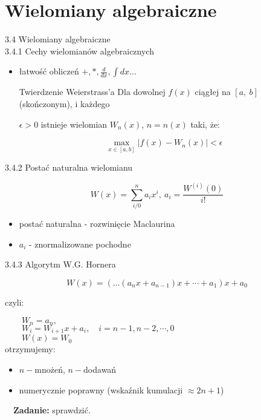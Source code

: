 \section{Wielomiany algebraiczne}
	\begin{frame}{3.4 Wielomiany algebraiczne \\ 3.4.1 Cechy wielomianów algebraicznych}
	

	\begin{itemize}
	\item łatwość obliczeń $+, *, \displaystyle \frac{d}{dx}, \displaystyle \int dx\ldots $ \newline
    
   
    \begin{block}{Twierdzenie Weierstrass'a}
    Dla dowolnej $f(x)$ ciągłej na $[a,\ b]$ (skończonym), i każdego 
   
    $\epsilon>0$ istnieje wielomian $W_{n}(x)$, $n=n(x)$ taki, że:

	\[ \max\limits_{x \in [a,b]}|f(x)-W_{n}(x)|<\epsilon \]
    
    
  	\end{block}
    \end{itemize}
     
	\end{frame}
    
    \begin{frame}{3.4.2 Postać naturalna wielomianu}
    \begin{block}{}
		$$W(x)=\sum_{i/0}^{n}a_{i}x^{i},\ a_{i}=\frac{W^{(i)}(0)}{i!}$$
    \end{block}
        \begin{itemize}
        \item postać naturalna - rozwinięcie Maclaurina \\
        
        \item $a_{i}$ - znormalizowane pochodne
		\end{itemize}
    \end{frame}
    
    \begin{frame}{3.4.3 Algorytm W.G. Hornera}
    \setlength\parindent{24pt} 
	\begin{block}{}
		$$W(x)=(\ldots(a_{n}x+a_{n-1})x+\cdots+a_{1})x+a_{0}$$
	\end{block}
	czyli:
	
	$\qquad W_{n}=a_{n},$ \\
	
	$\qquad W_{i}=W_{i+1}x+a_{i}, \quad i=n-1, n-2, \cdots , 0$ \\
	
	$\qquad W(x)=W_{0}$ \\
	
	otrzymujemy:
	\begin{itemize}
	\item $n-$mnożeń, $n -$dodawań
	\item numerycznie poprawny (wskaźnik kumulacji $\approx 2n+1$)
	\end{itemize} 
    \vspace{3mm}
	$\quad$\textbf{Zadanie:} sprawdzić.
    \end{frame}
    
